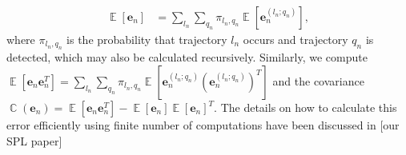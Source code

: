 \documentclass[journal]{IEEEtran}
\DeclareMathOperator{\E}{\mathbb{E}}
\DeclareMathOperator{\C}{\mathbb{C}}
\begin{document}
\begin{align}
    \E[\bm{e}_n]&=\sum_{l_n}\sum_{q_n}\pi_{l_n,q_n}\E[\bm{e}_n^{(l_n;q_n)}],%
\end{align}
 where $\pi_{l_n,q_n}$ is the probability that trajectory $l_n$ occurs and trajectory $q_n$ is detected, which may also be calculated recursively. Similarly, we compute $\E[\bm{e}_n\bm{e}_n^T]=\sum_{l_n}\sum_{q_n}\pi_{l_n,q_n}\E[\bm{e}_n^{(l_n;q_n)}{(\bm{e}_n^{(l_n;q_n)})}^T]$ and the covariance $ \C(\bm{e}_n) =\E[\bm{e}_n\bm{e}_n^T]-\E[\bm{e}_n]\E[\bm{e}_n]^T$. The details on how to calculate this error efficiently using finite number of computations have been discussed in [our SPL paper] 
\end{document}

